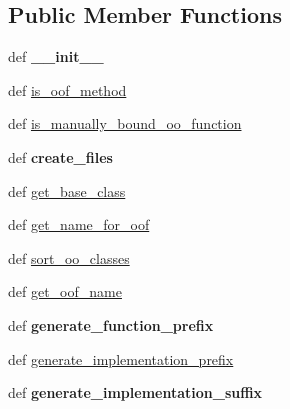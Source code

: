 \subsection*{Public Member Functions}
\begin{DoxyCompactItemize}
\item 
\hypertarget{classgenerate__js__bindings_1_1_j_s_b_generate_o_o_functions_aa37c264beb44b7ceb4b0875ad695296a}{def {\bfseries \-\_\-\-\_\-init\-\_\-\-\_\-}}\label{classgenerate__js__bindings_1_1_j_s_b_generate_o_o_functions_aa37c264beb44b7ceb4b0875ad695296a}

\item 
def \hyperlink{classgenerate__js__bindings_1_1_j_s_b_generate_o_o_functions_aa91011cd940c4779d2fb77892a4ee387}{is\-\_\-oof\-\_\-method}
\item 
def \hyperlink{classgenerate__js__bindings_1_1_j_s_b_generate_o_o_functions_a27ddb2bc488d83f3233bee708d417d51}{is\-\_\-manually\-\_\-bound\-\_\-oo\-\_\-function}
\item 
\hypertarget{classgenerate__js__bindings_1_1_j_s_b_generate_o_o_functions_a90e5fd41d96f9bc60b252832f6d2ac37}{def {\bfseries create\-\_\-files}}\label{classgenerate__js__bindings_1_1_j_s_b_generate_o_o_functions_a90e5fd41d96f9bc60b252832f6d2ac37}

\item 
def \hyperlink{classgenerate__js__bindings_1_1_j_s_b_generate_o_o_functions_a62ff159a985272c5384e4fdc18a2a286}{get\-\_\-base\-\_\-class}
\item 
def \hyperlink{classgenerate__js__bindings_1_1_j_s_b_generate_o_o_functions_a7a31e544fa1a1a84332357223d8e31cc}{get\-\_\-name\-\_\-for\-\_\-oof}
\item 
def \hyperlink{classgenerate__js__bindings_1_1_j_s_b_generate_o_o_functions_ae03498738979fd922bb5e78fae559b65}{sort\-\_\-oo\-\_\-classes}
\item 
def \hyperlink{classgenerate__js__bindings_1_1_j_s_b_generate_o_o_functions_adb052f03a11a8c786c99f524390a6b8d}{get\-\_\-oof\-\_\-name}
\item 
\hypertarget{classgenerate__js__bindings_1_1_j_s_b_generate_o_o_functions_aca8873f36b243a08f903428e29749056}{def {\bfseries generate\-\_\-function\-\_\-prefix}}\label{classgenerate__js__bindings_1_1_j_s_b_generate_o_o_functions_aca8873f36b243a08f903428e29749056}

\item 
def \hyperlink{classgenerate__js__bindings_1_1_j_s_b_generate_o_o_functions_ad4ed6cc0de0f0f6ad051ecb58f8b465f}{generate\-\_\-implementation\-\_\-prefix}
\item 
\hypertarget{classgenerate__js__bindings_1_1_j_s_b_generate_o_o_functions_a3522336e3d19cce6cd999e4a0114125f}{def {\bfseries generate\-\_\-implementation\-\_\-suffix}}\label{classgenerate__js__bindings_1_1_j_s_b_generate_o_o_functions_a3522336e3d19cce6cd999e4a0114125f}


\end{DoxyCompactItemize}
